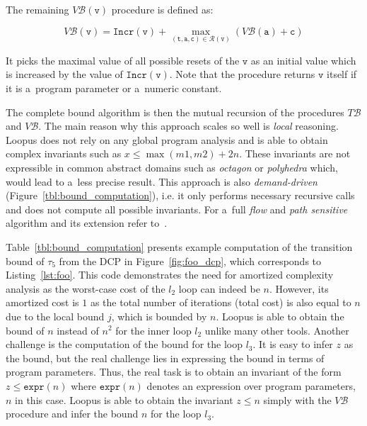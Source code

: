 \documentclass{ExcelAtFIT}
\begin{document}
The remaining $V\mathcal{B}(\mathtt{v})$ procedure
is defined as:
\begin{linenomath}
\begin{equation*}
V\mathcal{B}(\mathtt{v}) =
\mathtt{Incr}(\mathtt{v}) +
\max\limits_{(\mathtt{t, a, c})\in
\mathcal{R}(\mathtt{v})}(
V\mathcal{B}(\mathtt{a}) + \mathtt{c})
\end{equation*}
\end{linenomath}
It picks the maximal value of all possible resets of
the $\mathtt{v}$ as an initial value which is
increased by the value of
$\mathtt{Incr(v)}$. Note that the procedure returns
$\mathtt{v}$ itself if it is a~program parameter or
a~numeric constant.

The complete bound algorithm is then
the mutual recursion of the procedures $T\mathcal{B}$ and
$V\mathcal{B}$. The main reason why this approach scales
so well is \textit{local} reasoning. Loopus does not
rely on any global program analysis and is able to
obtain complex invariants such as
$x \leq \max(m1,m2) + 2n$.
These invariants are not expressible in common abstract
domains such as \textit{octagon} or \textit{polyhedra}
which, would lead to a~less precise result. This approach
is also \textit{demand-driven} (Figure~\ref{tbl:bound_computation}), 
i.e. it only performs necessary recursive calls and does not
compute all possible invariants. 
For a~full \textit{flow} and \textit{path sensitive}
algorithm and its extension refer
to~\cite{loopus-tool}.

Table~\ref{tbl:bound_computation} presents
example computation of the transition bound of
$\tau_5$ from the DCP in Figure~\ref{fig:foo_dcp},
which corresponds to Listing~\ref{lst:foo}. This code
demonstrates
the need for amortized complexity analysis as the
worst-case cost of the $l_2$ loop can indeed be
$n$. However, its amortized cost is $1$ as the
total number of iterations (total cost) is also equal
to $n$ due to the local bound $j$, which is bounded by
$n$. Loopus is able to obtain the bound of $n$ instead
of $n^2$ for the inner loop $l_2$ unlike many other tools.
Another challenge is the computation of
the bound for the loop $l_3$. It is easy to infer $z$
as the bound, but the real challenge lies in expressing
the bound in terms of program parameters. Thus, the
real task is to obtain an invariant of the form
$z \leq \mathtt{expr}(n)$ where $\mathtt{expr}(n)$
denotes an expression over program parameters,
$n$ in this case. Loopus is able to obtain the
invariant $z \leq n$ simply with the $V\mathcal{B}$
procedure and infer the bound $n$ for
the loop $l_3$.
\end{document}
